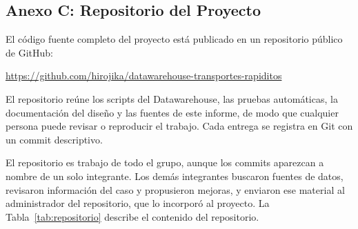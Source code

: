 \subsection{Anexo C: Repositorio del Proyecto}
\label{sec:anexo_repositorio}

El código fuente completo del proyecto está publicado en un repositorio
público de GitHub:

\begin{center}
  \url{https://github.com/hirojika/datawarehouse-transportes-rapiditos}
\end{center}

El repositorio reúne los scripts del Datawarehouse, las pruebas automáticas,
la documentación del diseño y las fuentes de este
informe, de modo que cualquier persona puede revisar o reproducir el trabajo.
Cada entrega se registra en Git con un commit descriptivo.

El repositorio es trabajo de todo el grupo, aunque los commits aparezcan a
nombre de un solo integrante. Los demás integrantes buscaron fuentes de
datos, revisaron información del caso y propusieron mejoras, y enviaron ese
material al administrador del repositorio, que lo incorporó al proyecto. La
Tabla~\ref{tab:repositorio} describe el contenido del repositorio.

